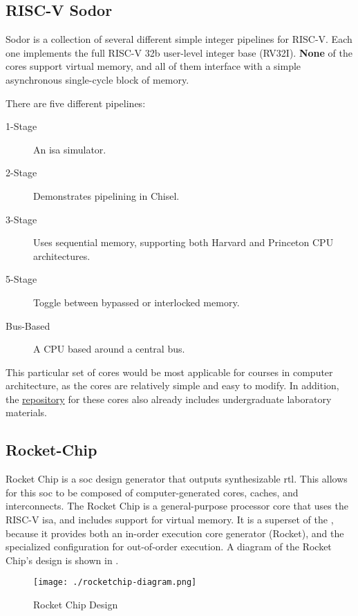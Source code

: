\subsection{RISC-V Sodor}\label{sec:RISC-V_Sodor}
\nocite{sodorGithub}
Sodor is a collection of several different simple integer pipelines for RISC-V.
Each one implements the full RISC-V 32b user-level integer base (RV32I).
\textbf{None} of the cores support virtual memory, and all of them interface with a simple asynchronous single-cycle block of memory.

There are five different pipelines:
\begin{description}
\item[1-Stage] An \gls{isa} simulator.
\item[2-Stage] Demonstrates pipelining in Chisel.
\item[3-Stage] Uses sequential memory, supporting both Harvard and Princeton CPU architectures.
\item[5-Stage] Toggle between bypassed or interlocked memory.
\item[Bus-Based] A CPU based around a central bus.
\end{description}

This particular set of cores would be most applicable for courses in computer architecture, as the cores are relatively simple and easy to modify.
In addition, the \href{https://github.com/ucb-bar/riscv-sodor}{repository} for these cores also already includes undergraduate laboratory materials.

\subsection{Rocket-Chip}\label{sec:Rocket_Chip}
\nocite{rocketChipPaper}
\nocite{rocketChipGithub}
Rocket Chip is a \gls{soc} design generator that outputs synthesizable \gls{rtl}.
This allows for this \gls{soc} to be composed of computer-generated cores, caches, and interconnects.
The Rocket Chip is a general-purpose processor core that uses the RISC-V \gls{isa}, and includes support for virtual memory.
It is a superset of the , because it provides both an in-order execution core generator (Rocket), and the specialized  configuration for out-of-order execution.
A diagram of the Rocket Chip's design is shown in .

\begin{figure}[h!tbp]
  \centering
  \texttt{[image: ./rocketchip-diagram.png]}
  \caption{Rocket Chip Design~\cite{rocketChipPaper}}
  \label{fig:Rocket_Chip_Design}
\end{figure}


